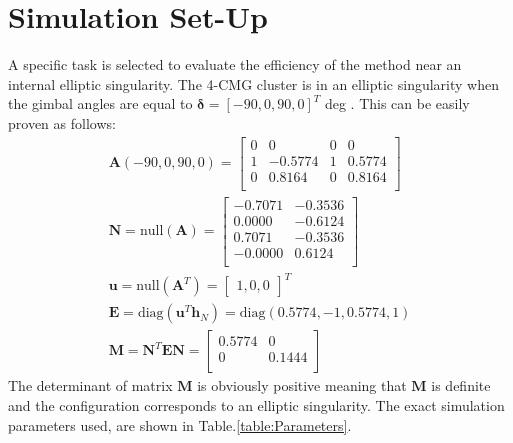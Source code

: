 \documentclass[journal]{new-aiaa}
\begin{document}
\section{Simulation Set-Up}
A specific task is selected to evaluate the efficiency of the method near an internal elliptic singularity. The 4-CMG cluster is in an elliptic singularity when the gimbal angles are equal to $\boldsymbol{\delta}=[-90, 0, 90, 0]^T $ deg \cite{bongwie2004}. This can be easily proven as follows:
\begin{equation}
\begin{matrix}
\textbf{A}(-90, 0, 90, 0)=\begin{bmatrix}
 0      &   0 &   0     &  0 \\
 1 &  -0.5774  &  1    & 0.5774 \\
 0 & 0.8164 & 0 & 0.8164\\
\end{bmatrix} \\ 
\textbf{N}=\mathrm{null}(\textbf{A})=
\begin{bmatrix}
 -0.7071 &  -0.3536 \\
 0.0000   & -0.6124 \\
 0.7071   & -0.3536\\
  -0.0000   & 0.6124\\
 \end{bmatrix} \\
 \textbf{u}=\mathrm{null}(\textbf{A}^T)=\begin{bmatrix}1, 0, 0\end{bmatrix}^T \\
 \textbf{E}=\mathrm{diag}(\textbf{u}^T\textbf{h}_N)=\mathrm{diag}(0.5774, -1, 0.5774, 1) \\
 \textbf{M}=\textbf{N}^T\textbf{E}\textbf{N}=
 \begin{bmatrix}
    0.5774  &  0 \\
    0  &  0.1444 \\
 \end{bmatrix}
\end{matrix}
\end{equation}
The determinant of matrix $\textbf{M}$ is obviously positive meaning that $\textbf{M}$ is definite and the configuration corresponds to an elliptic singularity. 
The exact simulation parameters used, are shown in Table.\ref{table:Parameters}.
\end{document}

